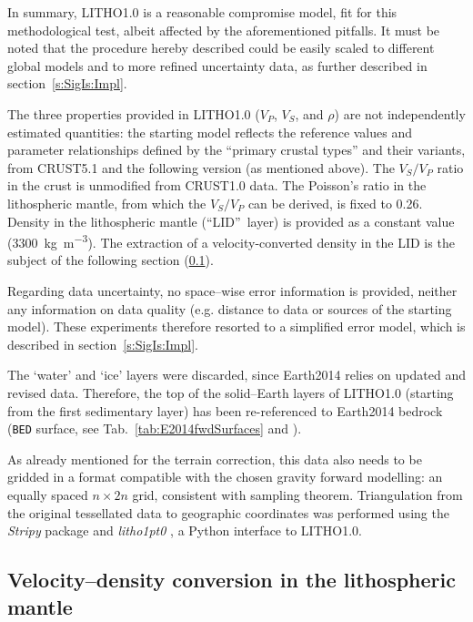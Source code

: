 In summary, {LITHO1.0} is a reasonable compromise model, fit for this methodological test, albeit affected by the aforementioned pitfalls.
It must be noted that the procedure hereby described could be easily scaled to different global models and to more refined uncertainty data, as further described in section~\ref{s:SigIs:Impl}.

The three properties provided in {LITHO1.0} ($V_P$, $V_S$, and $\rho$) are not independently estimated quantities: the starting model reflects the reference values and parameter relationships defined by the  ``primary crustal types'' and their variants, from {CRUST5.1} \parencite{Mooney1998_Crust51} and the following version (as mentioned above).
The $V_S/V_P$ ratio in the crust is unmodified from CRUST1.0 data.
The Poisson's ratio \parencite[see e.g.][]{Sheriff2002} in the lithospheric mantle, from which the $V_S/V_P$ can be derived, is fixed to \num{0.26}.
Density in the lithospheric mantle (``LID''~layer) is provided as a constant value (\SI{3300}{\kilo \gram \per \cubic \metre}).
The extraction of a velocity-converted density in the LID is the subject of the following section (\ref{ss:SigIs:InModels:SCLM}).

Regarding data uncertainty, no space--wise error information is provided, neither any information on data quality (e.g. distance to data or sources of the starting model).
These experiments therefore resorted to a simplified error model, which is described in section~\ref{s:SigIs:Impl}.

The `water' and `ice' layers were discarded, since {Earth2014} \parencite{Hirt2015} relies on updated and revised data.
Therefore, the top of the solid--Earth layers of {LITHO1.0} (starting from the first sedimentary layer) has been re-referenced to {Earth2014} bedrock (\texttt{BED} surface, see Tab.~\ref{tab:E2014fwdSurfaces} and \cite{Hirt2015_Earth2014readme}).

As already mentioned for the terrain correction, this data also needs to be gridded in a format compatible with the chosen gravity forward modelling: an equally spaced $n \times 2n$ grid, consistent with \textcite{Driscoll1994} sampling theorem.
Triangulation from the original tessellated data to geographic coordinates was performed using the \textit{Stripy} package \parencites{Moresi2019}{Moresi2019_zenodo} and \textit{litho1pt0} \parencite{Moresi2019_litho1pt0}, a Python interface to {LITHO1.0}.

\subsection{Velocity--density conversion in the lithospheric mantle}
\label{ss:SigIs:InModels:SCLM}

